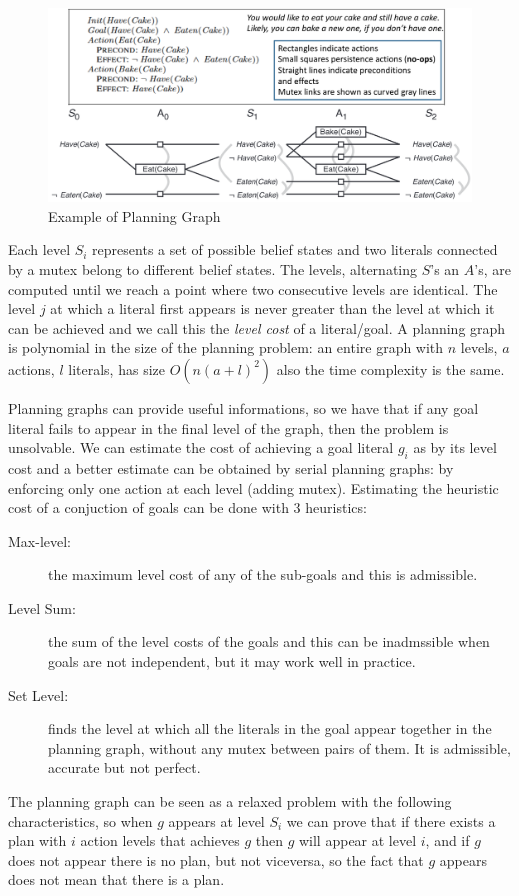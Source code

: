 \begin{figure}
	\includegraphics[width=\textwidth]{Images/examplePlanning}
	\caption{Example of Planning Graph}
	\label{img:examplePlanning}
\end{figure}
Each level $S_i$ represents a set of possible belief states and two literals connected by a mutex
belong to different belief states.\newline
The levels, alternating $S$'s an $A$'s, are computed until we reach a point where two consecutive
levels are identical.\newline
The level $j$ at which a literal first appears is never greater than the level at which it 
can be achieved and we call this the \emph{level cost} of a literal/goal.\newline
A planning graph is polynomial in the size of the planning problem: an entire graph with $n$ levels, $a$ actions, $l$ literals, has size $O(n (a + l)^2)$ also the time complexity is the same.

Planning graphs can provide useful informations, so we have that if any goal literal fails to 
appear in the final level of the graph, then the problem is unsolvable.\newline
We can estimate the cost of achieving a goal literal $g_i$ as by its level cost and a better
estimate can be obtained by serial planning graphs: by enforcing only one action at each level
(adding mutex).\newline 
Estimating the heuristic cost of a conjuction of goals can be done with $3$ heuristics:
\begin{description}
    \item [Max-level: ] the maximum level cost of any of the sub-goals and this is admissible.
    \item [Level Sum: ] the sum of the level costs of the goals and this can be inadmssible when
	                goals are not independent, but it may work well in practice.
    \item [Set Level: ] finds the level at which all the literals in the goal appear together in
	                the planning graph, without any mutex between pairs of them.\newline
			It is admissible, accurate but not perfect.
\end{description}
The planning graph can be seen as a relaxed problem with the following characteristics, so when
$g$ appears at level $S_i$ we can prove that if there exists a plan with $i$ action levels that
achieves $g$ then $g$ will appear at level $i$, and if $g$ does not appear there is no plan,
but not viceversa, so the fact that $g$ appears does not mean that there is a plan.


